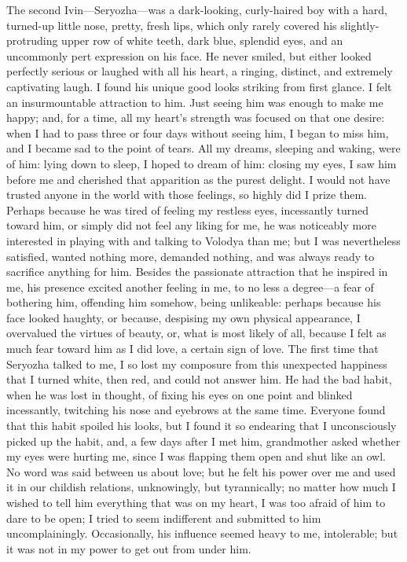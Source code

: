 The second Ivin---Seryozha---was a dark-looking, curly-haired boy with a hard, turned-up little nose, pretty, fresh lips, which only rarely covered his slightly-protruding upper row of white teeth, dark blue, splendid eyes, and an uncommonly pert expression on his face. He never smiled, but either looked perfectly serious or laughed with all his heart, a ringing, distinct, and extremely captivating laugh. I found his unique good looks striking from first glance. I felt an insurmountable attraction to him. Just seeing him was enough to make me happy; and, for a time, all my heart's strength was focused on that one desire: when I had to pass three or four days without seeing him, I began to miss him, and I became sad to the point of tears. All my dreams, sleeping and waking, were of him: lying down to sleep, I hoped to dream of him: closing my eyes, I saw him before me and cherished that apparition as the purest delight. I would not have trusted anyone in the world with those feelings, so highly did I prize them. Perhaps because he was tired of feeling my restless eyes, incessantly turned toward him, or simply did not feel any liking for me, he was noticeably more interested in playing with and talking to Volodya than me; but I was nevertheless satisfied, wanted nothing more, demanded nothing, and was always ready to sacrifice anything for him. Besides the passionate attraction that he inspired in me, his presence excited another feeling in me, to no less a degree---a fear of bothering him, offending him somehow, being unlikeable: perhaps because his face looked haughty, or because, despising my own physical appearance, I overvalued the virtues of beauty, or, what is most likely of all, because I felt as much fear toward him as I did love, a certain sign of love. The first time that Seryozha talked to me, I so lost my composure from this unexpected happiness that I turned white, then red, and could not answer him. He had the bad habit, when he was lost in thought, of fixing his eyes on one point and blinked incessantly, twitching his nose and eyebrows at the same time. Everyone found that this habit spoiled his looks, but I found it so endearing that I unconsciously picked up the habit, and, a few days after I met him, grandmother asked whether my eyes were hurting me, since I was flapping them open and shut like an owl. No word was said between us about love; but he felt his power over me and used it in our childish relations, unknowingly, but tyrannically; no matter how much I wished to tell him everything that was on my heart, I was too afraid of him to dare to be open; I tried to seem indifferent and submitted to him uncomplainingly. Occasionally, his influence seemed heavy to me, intolerable; but it was not in my power to get out from under him.

